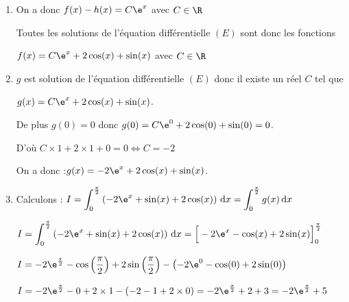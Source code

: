 \begin{enumerate}
Donc : $f'(x) =  f(x) -\cos (x)-3 \sin (x)$ c'est à dire $f$ est solution de $(E)$.

\emph{Conclusion :} $f$ est solution de $(E)$ si et seulement si $f-h$ est solution de $(E_0)$.
		\item

On a donc $f(x)-h(x)= C\e^x$ avec $C \in \R$

Toutes les solutions de l'équation différentielle $(E)$ sont donc les fonctions

$f(x)=C\e^x +2\cos(x)+\sin(x)$ avec $C \in \R$

\item $g$ est solution de l'équation différentielle $(E)$  donc il existe un réel $C$ tel que

$g(x)=C\e^x +2\cos(x)+\sin(x)$.

De plus  $g(0)=0$ donc $g(0)=C\e^0 +2\cos(0)+\sin(0)=0$.

D'où $C\times 1 +2\times 1 + 0 =0 \Longleftrightarrow C=-2$

On a donc :\quad $g(x)=-2\e^x +2\cos(x)+\sin(x)$.

		\item
Calculons : \quad$\displaystyle
I = \int_{0}^{\frac{\pi}{2}}\left(-2 \e^{x}+\sin (x)+2 \cos (x)\right)\,  \mathrm{d} x = \int_{0}^{\frac{\pi}{2}} g(x)\,  \mathrm{d} x $


$\displaystyle
I = 	\int_{0}^{\frac{\pi}{2}}\left(-2 \e^{x}+\sin (x)+2 \cos (x)\right)\,  \mathrm{d} x = \Big[ -2\e^{x} -\cos(x) +2\sin(x) \Big]_0^ {\frac{\pi}{2}}$

$I= -2\e^{\frac{\pi}{2}} -\cos\left(  {\dfrac{\pi}{2}}\right) +2\sin\left(  {\dfrac{\pi}{2}}\right)  - \left(  -2\e^{0} -\cos(0) +2\sin(0)  \right) $

$I= -2\e^{\frac{\pi}{2}} -0+2\times 1 - \left( -2 -1+2\times 0\right) =  -2\e^{\frac{\pi}{2}}+ 2 +3  = -2\e^{\frac{\pi}{2}}+ 5  $

		\end{enumerate}

\medskip
